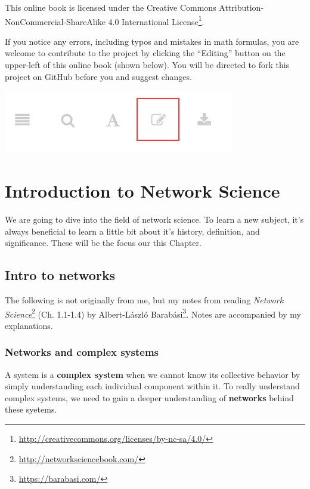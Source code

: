 \documentclass[
]{krantz}
\makeatletter
\renewcommand{\href}[2]{#2\footnote{\url{#1}}}
\newenvironment{kframe}{%
\medskip{}
\setlength{\fboxsep}{.8em}
 \def\at@end@of@kframe{}%
 \ifinner\ifhmode%
  \def\at@end@of@kframe{\end{minipage}}%
  \begin{minipage}{\columnwidth}%
 \fi\fi%
 \def\FrameCommand##1{\hskip\@totalleftmargin \hskip-\fboxsep
 \colorbox{shadecolor}{##1}\hskip-\fboxsep
     \hskip-\linewidth \hskip-\@totalleftmargin \hskip\columnwidth}%
 \MakeFramed {\advance\hsize-\width
   \@totalleftmargin\z@ \linewidth\hsize
   \@setminipage}}%
 {\par\unskip\endMakeFramed%
 \at@end@of@kframe}
\newenvironment{rmdblock}[1]
  {
  \begin{itemize}
  \renewcommand{\labelitemi}{
    \raisebox{-.7\height}[0pt][0pt]{
      {\setkeys{Gin}{width=3em,keepaspectratio}\texttt{[image: images/\#1]}}
    }
  }
  \setlength{\fboxsep}{1em}
  \begin{kframe}
  \item
  }
  {
  \end{kframe}
  \end{itemize}
  }
\newenvironment{rmdnote}
  {\begin{rmdblock}{note}}
  {\end{rmdblock}}
\makeatother
\begin{document}
This online book is licensed under the \href{http://creativecommons.org/licenses/by-nc-sa/4.0/}{Creative Commons Attribution-NonCommercial-ShareAlike 4.0 International License}.

If you notice any errors, including typos and mistakes in math formulas, you are welcome to contribute to the project by clicking the ``Editing'' button on the upper-left of this online book (shown below). You will be directed to fork this project on GitHub before you and suggest changes.

\begin{center}\includegraphics[width=0.45\linewidth]{images/edit} \end{center}

\mainmatter

\hypertarget{intro}{%
\chapter{Introduction to Network Science}\label{intro}}

We are going to dive into the field of network science. To learn a new subject, it's always beneficial to learn a little bit about it's history, definition, and significance. These will be the focus our this Chapter.

\hypertarget{intro-to-networks}{%
\section{Intro to networks}\label{intro-to-networks}}

\begin{rmdnote}
The following is not originally from me, but my notes from reading \href{http://networksciencebook.com/}{\emph{Network Science}} (Ch. 1.1-1.4) by \href{https://barabasi.com/}{Albert-László Barabási}. Notes are accompanied by my explanations.
\end{rmdnote}

\hypertarget{networks-and-complex-systems}{%
\subsection{Networks and complex systems}\label{networks-and-complex-systems}}

A system is a \textbf{complex system} when we cannot know its collective behavior by simply understanding each individual component within it. To really understand complex systems, we need to gain a deeper understanding of \textbf{networks} behind these syetems.
\end{document}
